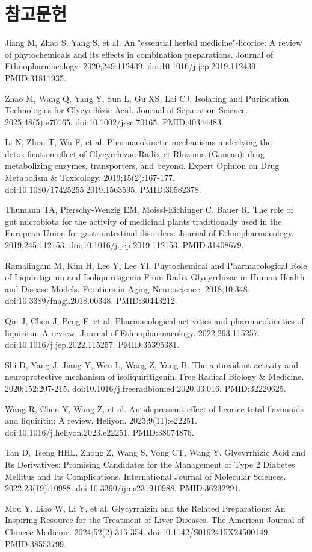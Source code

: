 \documentclass[11pt,oneside]{book}
\newcommand{\refstart}{\par\begingroup\footnotesize\setlength{\parskip}{2.5pt}\raggedright}
\newcommand{\reff}[2]{\par\hangindent=7mm\hangafter=1\noindent[#1]\hspace{2mm}#2\par}
\begin{document}
\section*{참고문헌}
\refstart
\reff{1}{Jiang M, Zhao S, Yang S, et al. An "essential herbal medicine"-licorice: A review of phytochemicals and its effects in combination preparations. Journal of Ethnopharmacology. 2020;249:112439. doi:10.1016/j.jep.2019.112439. PMID:31811935.}
\reff{2}{Zhao M, Wang Q, Yang Y, Sun L, Gu XS, Lai CJ. Isolating and Purification Technologies for Glycyrrhizic Acid. Journal of Separation Science. 2025;48(5):e70165. doi:10.1002/jssc.70165. PMID:40344483.}
\reff{3}{Li N, Zhou T, Wu F, et al. Pharmacokinetic mechanisms underlying the detoxification effect of Glycyrrhizae Radix et Rhizoma (Gancao): drug metabolizing enzymes, transporters, and beyond. Expert Opinion on Drug Metabolism \& Toxicology. 2019;15(2):167-177. doi:10.1080/17425255.2019.1563595. PMID:30582378.}
\reff{4}{Thumann TA, Pferschy-Wenzig EM, Moissl-Eichinger C, Bauer R. The role of gut microbiota for the activity of medicinal plants traditionally used in the European Union for gastrointestinal disorders. Journal of Ethnopharmacology. 2019;245:112153. doi:10.1016/j.jep.2019.112153. PMID:31408679.}
\reff{5}{Ramalingam M, Kim H, Lee Y, Lee YI. Phytochemical and Pharmacological Role of Liquiritigenin and Isoliquiritigenin From Radix Glycyrrhizae in Human Health and Disease Models. Frontiers in Aging Neuroscience. 2018;10:348. doi:10.3389/fnagi.2018.00348. PMID:30443212.}
\reff{6}{Qin J, Chen J, Peng F, et al. Pharmacological activities and pharmacokinetics of liquiritin: A review. Journal of Ethnopharmacology. 2022;293:115257. doi:10.1016/j.jep.2022.115257. PMID:35395381.}
\reff{7}{Shi D, Yang J, Jiang Y, Wen L, Wang Z, Yang B. The antioxidant activity and neuroprotective mechanism of isoliquiritigenin. Free Radical Biology \& Medicine. 2020;152:207-215. doi:10.1016/j.freeradbiomed.2020.03.016. PMID:32220625.}
\reff{8}{Wang R, Chen Y, Wang Z, et al. Antidepressant effect of licorice total flavonoids and liquiritin: A review. Heliyon. 2023;9(11):e22251. doi:10.1016/j.heliyon.2023.e22251. PMID:38074876.}
\reff{9}{Tan D, Tseng HHL, Zhong Z, Wang S, Vong CT, Wang Y. Glycyrrhizic Acid and Its Derivatives: Promising Candidates for the Management of Type 2 Diabetes Mellitus and Its Complications. International Journal of Molecular Sciences. 2022;23(19):10988. doi:10.3390/ijms231910988. PMID:36232291.}
\reff{10}{Mou Y, Liao W, Li Y, et al. Glycyrrhizin and the Related Preparations: An Inspiring Resource for the Treatment of Liver Diseases. The American Journal of Chinese Medicine. 2024;52(2):315-354. doi:10.1142/S0192415X24500149. PMID:38553799.}
\end{document}
